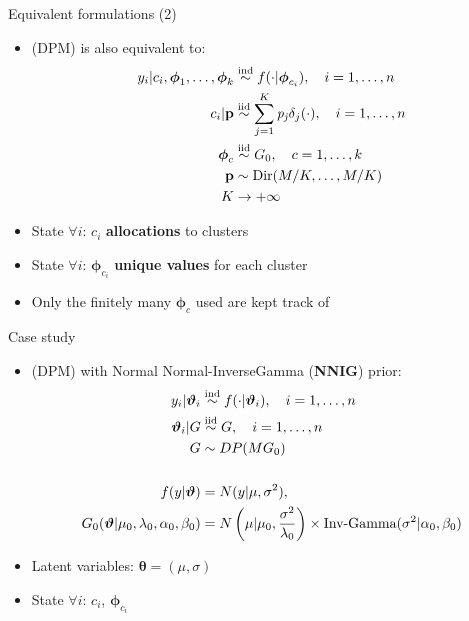 \begin{frame}{Equivalent formulations (2)} %
	\begin{itemize}
		\item (DPM) is also equivalent to:
		\begin{align*}
		y_{i}|c_i,\boldsymbol\phi_1,\dots,\boldsymbol\phi_k &\stackrel{\text{ind}}{\sim} f(\cdot|\boldsymbol\phi_{c_{i}}), \quad i=1,\dots,n \\
		c_{i}|\mathit{\mathbf{p}}&\stackrel{\text{iid}}{\sim} \sum_{j=1}^K\mathit{p_j} \delta_j(\cdot), \quad i=1,\dots,n \\
		\boldsymbol\phi_{c} & \stackrel{\text{iid}}{\sim} G_{0}, \quad c=1,\dots,k \\
		\mathbf{p} &\sim \operatorname{Dir}(M/K,\dots,M/K) \\
		K &\to +\infty
		\end{align*}
		\item State $\forall i$: $c_i$ \textbf{allocations} to clusters
		\item State $\forall i$: $\boldsymbol\phi_{c_i}$ \textbf{unique values} for each cluster
		\item Only the finitely many $\boldsymbol\phi_{c}$ used are kept track of
	\end{itemize}
\end{frame}


\begin{frame}{Case study} %
	\begin{itemize}
		\item (DPM) with Normal Normal-InverseGamma (\textbf{NNIG}) prior:
		\begin{align*}
		y_i | \boldsymbol{\vartheta}_i &\stackrel{\text{ind}}{\sim} f(\cdot|\boldsymbol{\vartheta}_i), \quad i=1,\dots,n \\
		\boldsymbol{\vartheta}_i | G &\stackrel{\text{iid}}{\sim} G, \quad i=1,\dots,n \\ 
		G &\sim DP(M G_0) \\
		\\
		f(y|\boldsymbol{\vartheta})&=N(y| \mu ,\sigma^2),  \\
		G_0(\boldsymbol{\vartheta}|\mu_0,\lambda_0, \alpha_0, 	\beta_0)
		&=N\left(\mu | \mu_0 ,\frac{\sigma^2} {\lambda_0}\right) \times \text{Inv-Gamma}(\sigma^2|\alpha_0, \beta_0 )
		\end{align*}
		\item Latent variables: $\boldsymbol\theta = (\mu,\sigma)$
		\item State $\forall i$: $c_i$, $\boldsymbol\phi_{c_i}$
	\end{itemize}
\end{frame}


